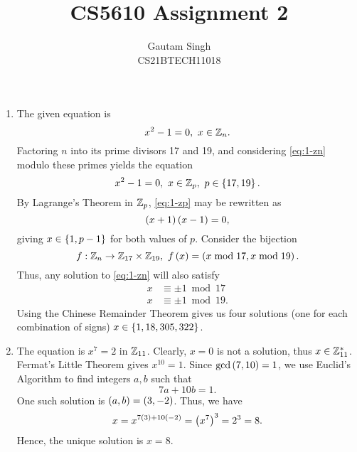 \documentclass[journal,12pt,onecolumn]{IEEEtran}
\begin{document}
\vspace{3cm}
\title{CS5610 Assignment 2}
\author{Gautam Singh\\CS21BTECH11018}
\maketitle
\bigskip

\begin{enumerate}
    \item The given equation is
    \begin{equation}
        x^2 - 1 = 0,\ x \in \bZ_n.
        \label{eq:1-zn}
    \end{equation}
    Factoring \(n\) into its prime divisors 17 and 19, and considering
    \eqref{eq:1-zn} modulo these primes yields the equation
    \begin{equation}
        x^2 - 1 = 0,\ x \in \mathbb Z_p,\ p \in \left\{17,19\right\}.
        \label{eq:1-zp}
    \end{equation}
    By Lagrange's Theorem in \(\mathbb Z_p\), \eqref{eq:1-zp} may be rewritten as
    \begin{equation}
        \left(x+1\right)\left(x-1\right) = 0,
        \label{eq:1-zp-fac}
    \end{equation}
    giving \(x \in \left\{1, p-1\right\}\) for both values of \(p\). Consider the
    bijection
    \begin{equation}
        f : \mathbb Z_n \to \mathbb Z_{17} \times \mathbb Z_{19},\ f\left(x\right) = \left(x \bmod 17, x \bmod 19\right).
        \label{eq:f-def}
    \end{equation}
    Thus, any solution to \eqref{eq:1-zn} will also satisfy
    \begin{align}
        x &\equiv \pm 1 \bmod 17 \\
        x &\equiv \pm 1 \bmod 19.
    \end{align}
    Using the Chinese Remainder Theorem gives us four solutions (one for each
    combination of signs) \(x \in \left\{1,18,305,322\right\}\).

    \item The equation is \(x^7 = 2\) in \(\mathbb Z_{11}\). Clearly, \(x = 0\) is not
    a solution, thus \(x \in \mathbb Z_{11}^*\). Fermat's Little Theorem gives
    \(x^{10} = 1\). Since \(\gcd\left(7,10\right) = 1\), we use Euclid's Algorithm to
    find integers \(a, b\) such that
    \begin{equation}
        7a + 10b = 1.
        \label{eq:2-gcd}
    \end{equation}
    One such solution is \(\left(a, b\right) = \left(3, -2\right)\). Thus, we have
    \begin{equation}
        x = x^{7\left(3\right) + 10\left(-2\right)} = \left(x^7\right)^3 = 2^3 = 8.
        \label{eq:2-sol}
    \end{equation}
    Hence, the unique solution is \(x = 8\).
    

\end{enumerate}
\end{document}
